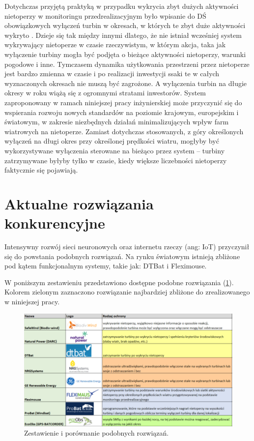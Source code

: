 \documentclass{sprz}
\begin{document}
Dotychczas przyjętą praktyką w przypadku wykrycia zbyt dużych aktywności nietoperzy w monitoringu przedrealizacyjnym było wpisanie do DŚ obowiązkowych wyłączeń turbin w okresach, w których te zbyt duże aktywności wykryto \cite{Wytyczne}. Dzieje się tak między innymi dlatego, że nie istniał wcześniej system wykrywający nietoperze w czasie rzeczywistym, w którym akcja, taka jak wyłączenie turbiny mogła być podjęta o bieżące aktywności nietoperzy, warunki pogodowe i inne. Tymczasem dynamika użytkowania przestrzeni przez nietoperze jest bardzo zmienna w czasie i po realizacji inwestycji ssaki te w całych wyznaczonych okresach nie muszą być zagrożone. A wyłączenia turbin na długie okresy w roku wiążą się z ogromnymi stratami inwestorów. System zaproponowany w ramach niniejszej pracy inżynierskiej może przyczynić się do wspierania rozwoju nowych standardów na poziomie krajowym, europejskim i światowym, w zakresie niezbędnych działań minimalizujących wpływ farm wiatrowych na nietoperze. Zamiast dotychczas stosowanych, z góry określonych wyłączeń na długi okres przy określonej prędkości wiatru, mogłyby być wykorzystywane wyłączenia sterowane na bieżąco przez system – turbiny zatrzymywane byłyby tylko w czasie, kiedy większe liczebności nietoperzy faktycznie się pojawiają.

\section{Aktualne rozwiązania konkurencyjne}

Intensywny rozwój sieci neuronowych oraz internetu rzeczy (ang: IoT) przyczynił się do powstania podobnych rozwiązań. Na rynku światowym istnieją zbliżone pod kątem funkcjonalnym systemy, takie jak: DTBat i Fleximouse. 

W poniższym zestawieniu przedstawiono dostępne podobne rozwiązania (\ref{img:konkurencja}). Kolorem zielonym zaznaczono rozwiązanie najbardziej zbliżone do zrealizowanego w niniejszej pracy.

\begin{figure}[h]
  \centering
  \includegraphics[width=1.0\textwidth]{sprz/konkurencja}
  \caption{Zestawienie i porównanie podobnych rozwiązań.}
  \label{img:konkurencja}
\end{figure} 
\end{document}
